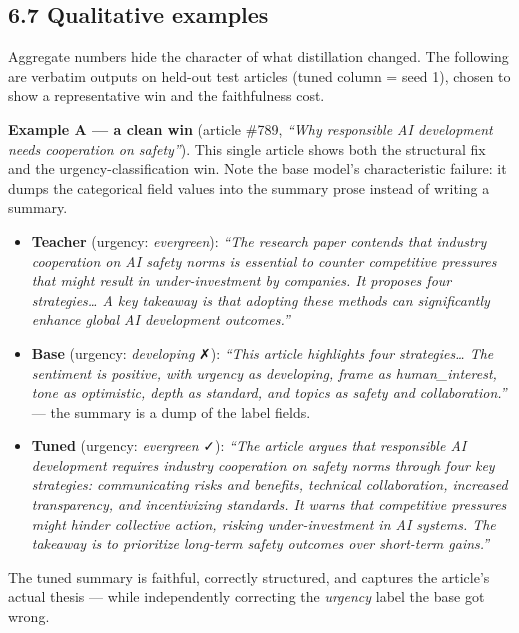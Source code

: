 \documentclass[11pt]{article}
\providecommand{\tightlist}{\setlength{\itemsep}{0pt}\setlength{\parskip}{0pt}}
\providecommand{\tightlist}{%
  \setlength{\itemsep}{0pt}\setlength{\parskip}{0pt}}
\begin{document}
\subsection{6.7 Qualitative examples}\label{qualitative-examples}

Aggregate numbers hide the character of what distillation changed. The
following are verbatim outputs on held-out test articles (tuned column =
seed 1), chosen to show a representative win and the faithfulness cost.

\textbf{Example A --- a clean win} (article \#789, \emph{``Why
responsible AI development needs cooperation on safety''}). This single
article shows both the structural fix and the urgency-classification
win. Note the base model's characteristic failure: it dumps the
categorical field values into the summary prose instead of writing a
summary.

\begin{itemize}
\tightlist
\item
  \textbf{Teacher} (urgency: \emph{evergreen}): \emph{``The research
  paper contends that industry cooperation on AI safety norms is
  essential to counter competitive pressures that might result in
  under-investment by companies. It proposes four strategies\ldots{} A
  key takeaway is that adopting these methods can significantly enhance
  global AI development outcomes.''}
\item
  \textbf{Base} (urgency: \emph{developing} ✗): \emph{``This article
  highlights four strategies\ldots{} The sentiment is positive, with
  urgency as developing, frame as human\_interest, tone as optimistic,
  depth as standard, and topics as safety and collaboration.''} --- the
  summary is a dump of the label fields.
\item
  \textbf{Tuned} (urgency: \emph{evergreen} ✓): \emph{``The article
  argues that responsible AI development requires industry cooperation
  on safety norms through four key strategies: communicating risks and
  benefits, technical collaboration, increased transparency, and
  incentivizing standards. It warns that competitive pressures might
  hinder collective action, risking under-investment in AI systems. The
  takeaway is to prioritize long-term safety outcomes over short-term
  gains.''}
\end{itemize}

The tuned summary is faithful, correctly structured, and captures the
article's actual thesis --- while independently correcting the
\emph{urgency} label the base got wrong.
\end{document}

